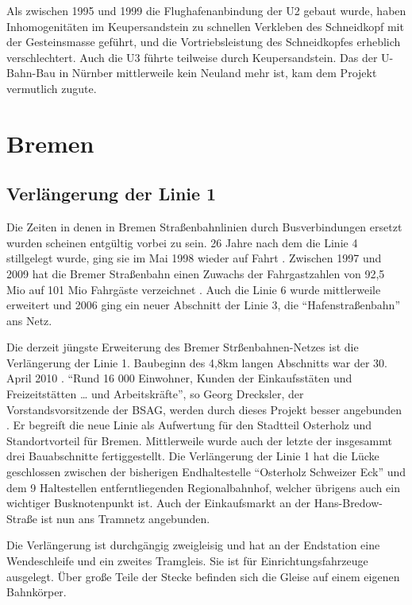 Als zwischen 1995 und 1999 die Flughafenanbindung der U2 gebaut wurde, haben Inhomogenitäten im Keupersandstein zu schnellen Verkleben des Schneidkopf mit der Gesteinsmasse geführt, und die Vortriebsleistung des Schneidkopfes erheblich verschlechtert\cite{nbGeo}. Auch die U3 führte teilweise durch Keupersandstein\cite{nbRef3}. Das der U-Bahn-Bau in Nürnber mittlerweile kein Neuland mehr ist, kam dem Projekt vermutlich zugute.

\section{Bremen}
\subsection*{Verlängerung der Linie 1}

Die Zeiten in denen in Bremen Straßenbahnlinien durch Busverbindungen ersetzt wurden scheinen entgültig vorbei zu sein. 26 Jahre nach dem die Linie 4 stillgelegt wurde, ging sie im Mai 1998 wieder auf Fahrt \cite{bSv11}. Zwischen 1997 und 2009 hat die Bremer Straßenbahn einen Zuwachs der Fahrgastzahlen von 92,5 Mio auf 101 Mio Fahrgäste verzeichnet \cite{bNp10}. Auch die Linie 6 wurde mittlerweile erweitert und 2006 ging ein neuer Abschnitt der Linie 3, die ``Hafenstraßenbahn'' ans Netz. 

Die derzeit jüngste Erweiterung des Bremer Strßenbahnen-Netzes ist die Verlängerung der Linie 1. Baubeginn des 4,8km langen Abschnitts war der 30. April 2010 \cite{bNp10}. ``Rund 16 000 Einwohner, Kunden der Einkaufsstäten und Freizeitstätten {…} und Arbeitskräfte'', so Georg Drecksler, der Vorstandsvorsitzende der BSAG, werden durch dieses Projekt besser angebunden \cite{bNp10}. Er begreift die neue Linie als Aufwertung für den Stadtteil Osterholz und Standortvorteil für Bremen. Mittlerweile wurde auch der letzte der insgesammt drei Bauabschnitte\cite{bSv12} fertiggestellt. Die Verlängerung der Linie 1 hat die Lücke geschlossen zwischen der bisherigen Endhaltestelle ``Osterholz Schweizer Eck'' und dem 9 Haltestellen entferntliegenden Regionalbahnhof, welcher übrigens auch ein wichtiger Busknotenpunkt ist. Auch der Einkaufsmarkt an der Hans-Bredow-Straße ist nun ans Tramnetz angebunden.

Die Verlängerung ist durchgängig zweigleisig und hat an der Endstation eine Wendeschleife und ein zweites Tramgleis. Sie ist für Einrichtungsfahrzeuge ausgelegt. Über große Teile der Stecke befinden sich die Gleise auf einem eigenen Bahnkörper\cite{bBub11}. 


